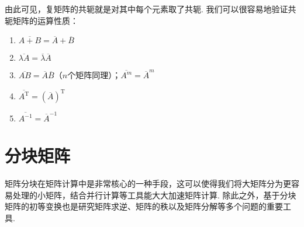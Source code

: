 由此可见，复矩阵的共轭就是对其中每个元素取了共轭. 我们可以很容易地验证共轭矩阵的运算性质：
\begin{enumerate}
    \item $\overline{A+B}=\overline{A}+\overline{B}$

    \item $\overline{\lambda A}=\overline{\lambda}\overline{A}$

    \item $\overline{AB}=\overline{A}\overline{B}$（$n$个矩阵同理）；$\overline{A^m}=\overline{A}^m$

    \item $\overline{A^\mathrm{T}}=(\overline{A})^\mathrm{T}$

    \item $\overline{A^{-1}}=\overline{A}^{-1}$
\end{enumerate}

\section{分块矩阵} \label{sec:分块矩阵}

矩阵分块在矩阵计算中是非常核心的一种手段，这可以使得我们将大矩阵分为更容易处理的小矩阵，结合并行计算等工具能大大加速矩阵计算. 除此之外，基于分块矩阵的初等变换也是研究矩阵求逆、矩阵的秩以及矩阵分解等多个问题的重要工具.

